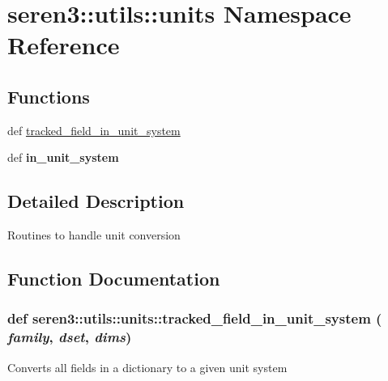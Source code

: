 \hypertarget{namespaceseren3_1_1utils_1_1units}{
\section{seren3::utils::units Namespace Reference}
\label{namespaceseren3_1_1utils_1_1units}
}
\subsection*{Functions}
\begin{DoxyCompactItemize}
\item 
def \hyperlink{namespaceseren3_1_1utils_1_1units_ae062d049a3106cab731b32de7d156fd6}{tracked\_\-field\_\-in\_\-unit\_\-system}
\item 
\hypertarget{namespaceseren3_1_1utils_1_1units_a654f6980e632362de7f87d51624b6253}{
def {\bfseries in\_\-unit\_\-system}}
\label{namespaceseren3_1_1utils_1_1units_a654f6980e632362de7f87d51624b6253}

\end{DoxyCompactItemize}


\subsection{Detailed Description}
\begin{DoxyVerb}
Routines to handle unit conversion
\end{DoxyVerb}
 

\subsection{Function Documentation}
\hypertarget{namespaceseren3_1_1utils_1_1units_ae062d049a3106cab731b32de7d156fd6}{
\subsubsection[{tracked\_\-field\_\-in\_\-unit\_\-system}]{\setlength{\rightskip}{0pt plus 5cm}def seren3::utils::units::tracked\_\-field\_\-in\_\-unit\_\-system ( {\em family}, \/   {\em dset}, \/   {\em dims})}}
\label{namespaceseren3_1_1utils_1_1units_ae062d049a3106cab731b32de7d156fd6}
\begin{DoxyVerb}
Converts all fields in a dictionary to a given unit system
\end{DoxyVerb}
 